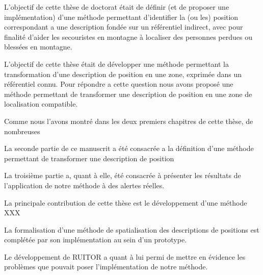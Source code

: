 

L'objectif de cette thèse de doctorat était de définir (et de proposer
une implémentation) d'une méthode permettant d'identifier la (ou les)
position correspondant a une description fondée sur un référentiel
indirect, avec pour finalité d'aider les secouristes en montagne à
localiser des personnes perdues ou blessées en montagne.













L'objectif de cette thèse était de développer une méthode permettant
la transformation d'une description de position en une zone, exprimée
dans un référentiel connu.
%
Pour répondre a cette question nous avons proposé une méthode
permettant de transformer une description de position en une zone de
localisation compatible.



Comme nous l'avons montré dans les deux premiers chapitres de cette
thèse, de nombreuses

La seconde partie de ce manuscrit a été consacrée a la définition
d'une méthode permettant de transformer une description de position



La troisième partie a, quant à elle, été consacrée à présenter les
résultats de l’application de notre méthode à des alertes
réelles. 




La principale contribution de cette thèse est le développement d'une
méthode XXX




La formalisation d'une méthode de spatialisation des descriptions de
positions est complétée par son implémentation au sein d'un prototype.





Le développement de RUITOR a quant à lui permi de mettre en évidence
les problèmes que pouvait poser l'implémentation de notre méthode.


